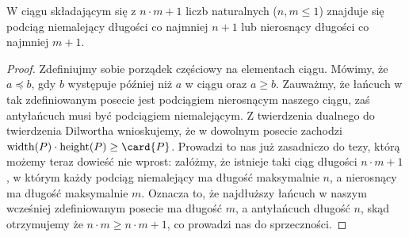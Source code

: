 \begin{theorem}
	W ciągu składającym się z $n \cdot m + 1$ liczb naturalnych ($n,m \leq 1$) znajduje
	się podciąg niemalejący długości co najmniej $n + 1$ lub nierosnący długości co najmniej
	$m + 1$.
\end{theorem}

\begin{proof}
	Zdefiniujmy sobie porządek częściowy na elementach ciągu. Mówimy, że $a \preceq b$,
	gdy $b$ występuje później niż $a$ w ciągu oraz $a \geq b$. Zauważmy, że łańcuch w
	tak zdefiniowanym posecie jest podciągiem nierosnącym naszego ciągu, zaś antyłańcuch
	musi być podciągiem niemalejącym.
	Z twierdzenia dualnego do twierdzenia Dilwortha wnioskujemy, że w dowolnym posecie
	zachodzi $\posetwidth(P) \cdot \posetheight(P) \geq \card{P}$.
	Prowadzi to nas już zasadniczo do tezy, którą możemy teraz dowieść nie wprost:
	załóżmy, że istnieje taki ciąg długości $n \cdot m + 1$, w którym każdy podciąg
	niemalejący ma długość maksymalnie $n$, a nierosnący ma długość maksymalnie $m$.
	Oznacza to, że najdłuższy łańcuch w naszym wcześniej zdefiniowanym
	posecie ma długość $m$, a antyłańcuch długość $n$, skąd otrzymujemy że
	$n \cdot m \geq n \cdot m + 1$, co prowadzi nas do sprzeczności.
\end{proof}

